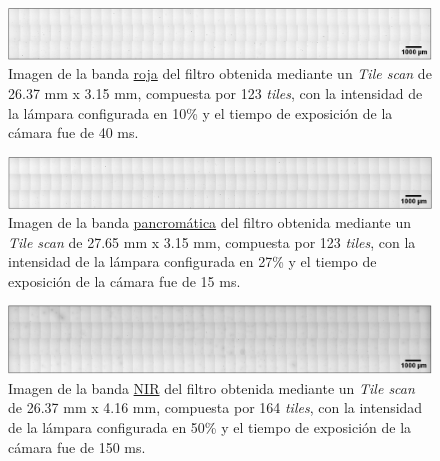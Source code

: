 \begin{figure}[H]
	\centering
	\includegraphics[width=1.0\textwidth]{Figs/cuantificaciondefectos/banda_PANC.png}
	\caption{Imagen de la banda \underline{roja} del filtro obtenida mediante un \textit{Tile scan} de 26.37 mm x 3.15 mm, compuesta por 123 \textit{tiles}, con la intensidad de la lámpara configurada en 10\% y el tiempo de exposición de la cámara fue de 40 ms.}
	\label{fig:tilebandapanc}
\end{figure}
\begin{figure}[H]
	\centering
	\includegraphics[width=1.0\textwidth]{Figs/defectosZEISS/tilebandaroja.png}
	\caption{Imagen de la banda \underline{pancromática} del filtro obtenida mediante un \textit{Tile scan} de 27.65 mm x 3.15 mm, compuesta por 123 \textit{tiles}, con la intensidad de la lámpara configurada en 27\% y el tiempo de exposición de la cámara fue de 15 ms.}
	\label{fig:tilebandaroja}
\end{figure}

\begin{figure}[H]
	\centering
	\includegraphics[width=1.0\textwidth]{Figs/cuantificaciondefectos/banda_NIR.png}
	\caption{Imagen de la banda \underline{NIR} del filtro obtenida mediante un \textit{Tile scan} de 26.37 mm x 4.16 mm, compuesta por 164 \textit{tiles}, con la intensidad de la lámpara configurada en 50\% y el tiempo de exposición de la cámara fue de 150 ms.}
	\label{fig:tilebandanir}
\end{figure}

